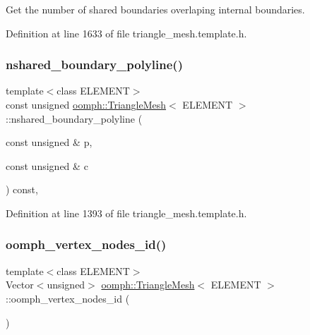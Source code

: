 Get the number of shared boundaries overlaping internal boundaries. 



Definition at line 1633 of file triangle\+\_\+mesh.\+template.\+h.

\mbox{\label{classoomph_1_1TriangleMesh_a5540ac8439cbd641020d59c5d57a854f}} 
\subsubsection{\texorpdfstring{nshared\+\_\+boundary\+\_\+polyline()}{nshared\_boundary\_polyline()}}
{\footnotesize\ttfamily template$<$class E\+L\+E\+M\+E\+NT$>$ \\
const unsigned \hyperlink{classoomph_1_1TriangleMesh}{oomph\+::\+Triangle\+Mesh}$<$ E\+L\+E\+M\+E\+NT $>$\+::nshared\+\_\+boundary\+\_\+polyline (\begin{DoxyParamCaption}\item[{const unsigned \&}]{p,  }\item[{const unsigned \&}]{c }\end{DoxyParamCaption}) const\hspace{0.3cm}{\ttfamily [inline]}, {\ttfamily [protected]}}



Definition at line 1393 of file triangle\+\_\+mesh.\+template.\+h.

\mbox{\label{classoomph_1_1TriangleMesh_a993a88563e99dcdb241d87f1988602c9}} 
\subsubsection{\texorpdfstring{oomph\+\_\+vertex\+\_\+nodes\+\_\+id()}{oomph\_vertex\_nodes\_id()}}
{\footnotesize\ttfamily template$<$class E\+L\+E\+M\+E\+NT$>$ \\
Vector$<$unsigned$>$ \hyperlink{classoomph_1_1TriangleMesh}{oomph\+::\+Triangle\+Mesh}$<$ E\+L\+E\+M\+E\+NT $>$\+::oomph\+\_\+vertex\+\_\+nodes\+\_\+id (\begin{DoxyParamCaption}{ }\end{DoxyParamCaption})\hspace{0.3cm}{\ttfamily [inline]}}



